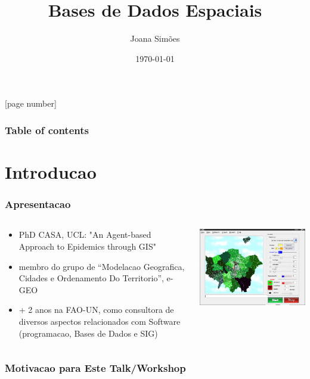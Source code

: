 \documentclass[hyperref={pdfpagelabels=true}]{beamer}
\title{Bases de Dados Espaciais}
\author{Joana Sim\~{o}es}
\date{\today}
\begin{document}
[page number]
\begin{frame}
\titlepage
\end{frame} 

\begin{frame}
\frametitle{Table of contents}
\tableofcontents
\end{frame}
 

\section{Introducao} 
\begin{frame}
\frametitle{Apresentacao}
\begin{columns}
  \begin{column}{7cm}
    \begin{itemize}
      \item<1-> PhD CASA, UCL: "An Agent-based Approach to Epidemics through GIS"
      \item<2-> membro do grupo de ``Modelacao Geografica, Cidades e Ordenamento Do Territorio'', e-GEO
      \item<3-> + 2 anos na FAO-UN, como consultora de diversos aspectos relacionados com Software (programacao, Bases de Dados e SIG)
      \end{itemize}
  \end{column}
  \begin{column}{10cm}
    \includegraphics[scale=0.4]{input1.png}
  \end{column}  
\end{columns}
\end{frame}


\begin{frame}
\frametitle{Motivacao para Este Talk/Workshop}
\end{frame}
\end{document}
